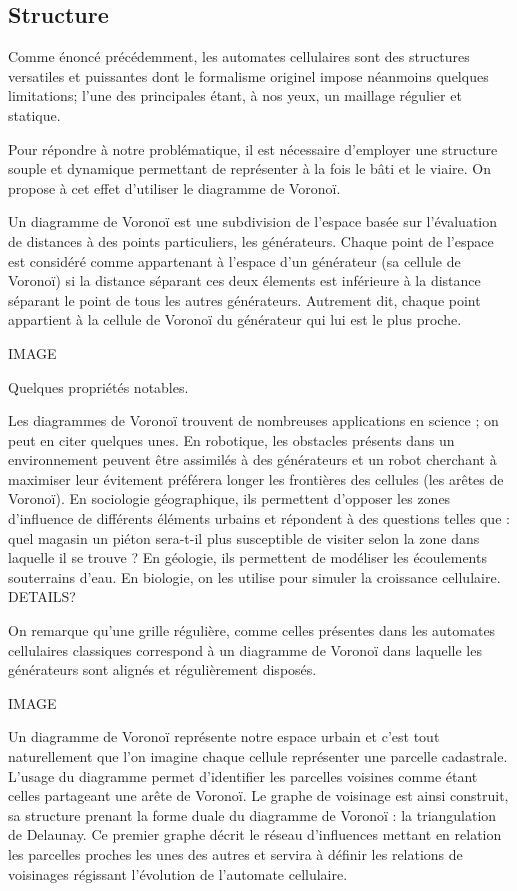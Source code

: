 \documentclass[10pt]{article}
\begin{document}
\subsection{Structure}

Comme énoncé précédemment, les automates cellulaires sont des
structures versatiles et puissantes dont le formalisme originel impose
néanmoins quelques limitations; l'une des principales étant, à nos
yeux, un maillage régulier et statique.

Pour répondre à notre problématique, il est nécessaire d'employer une
structure souple et dynamique permettant de représenter à la fois le
bâti et le viaire. On propose à cet effet d'utiliser le diagramme de
Voronoï.

Un diagramme de Voronoï est une subdivision de l'espace basée sur
l'évaluation de distances à des points particuliers, les
générateurs. Chaque point de l'espace est considéré comme appartenant
à l'espace d'un générateur (sa cellule de Voronoï) si la distance
séparant ces deux élements est inférieure à la distance séparant le
point de tous les autres générateurs. Autrement dit, chaque point
appartient à la cellule de Voronoï du générateur qui lui est le plus
proche.

IMAGE

Quelques propriétés notables.

Les diagrammes de Voronoï trouvent de nombreuses applications en
science ; on peut en citer quelques unes. En robotique, les obstacles
présents dans un environnement peuvent être assimilés à des
générateurs et un robot cherchant à maximiser leur évitement préférera
longer les frontières des cellules (les arêtes de Voronoï). En
sociologie géographique, ils permettent d'opposer les zones
d'influence de différents éléments urbains et répondent à des
questions telles que : quel magasin un piéton sera-t-il plus
susceptible de visiter selon la zone dans laquelle il se trouve ? En
géologie, ils permettent de modéliser les écoulements souterrains
d'eau. En biologie, on les utilise pour simuler la croissance
cellulaire. DETAILS?

On remarque qu'une grille régulière, comme celles présentes dans les
automates cellulaires classiques correspond à un diagramme de Voronoï
dans laquelle les générateurs sont alignés et régulièrement
disposés.

IMAGE

Un diagramme de Voronoï représente notre espace urbain et c'est tout
naturellement que l'on imagine chaque cellule représenter une parcelle
cadastrale. L'usage du diagramme permet d'identifier les parcelles
voisines comme étant celles partageant une arête de Voronoï. Le graphe
de voisinage est ainsi construit, sa structure prenant la forme duale
du diagramme de Voronoï : la triangulation de Delaunay. Ce premier
graphe décrit le réseau d'influences mettant en relation les parcelles
proches les unes des autres et servira à définir les relations de
voisinages régissant l'évolution de l'automate cellulaire.
\end{document}
